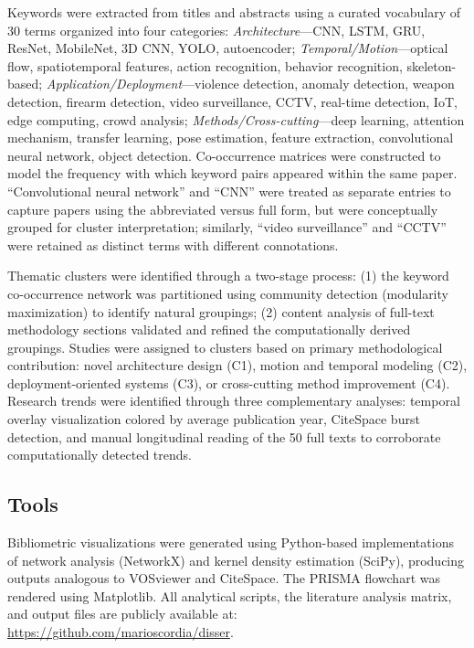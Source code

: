 \documentclass[conference]{IEEEtran}
\begin{document}
Keywords were extracted from titles and abstracts using a curated vocabulary of 30 terms organized into four categories: \textit{Architecture}---CNN, LSTM, GRU, ResNet, MobileNet, 3D CNN, YOLO, autoencoder; \textit{Temporal/Motion}---optical flow, spatiotemporal features, action recognition, behavior recognition, skeleton-based; \textit{Application/Deployment}---violence detection, anomaly detection, weapon detection, firearm detection, video surveillance, CCTV, real-time detection, IoT, edge computing, crowd analysis; \textit{Methods/Cross-cutting}---deep learning, attention mechanism, transfer learning, pose estimation, feature extraction, convolutional neural network, object detection. Co-occurrence matrices were constructed to model the frequency with which keyword pairs appeared within the same paper. ``Convolutional neural network'' and ``CNN'' were treated as separate entries to capture papers using the abbreviated versus full form, but were conceptually grouped for cluster interpretation; similarly, ``video surveillance'' and ``CCTV'' were retained as distinct terms with different connotations.

Thematic clusters were identified through a two-stage process: (1) the keyword co-occurrence network was partitioned using community detection (modularity maximization) to identify natural groupings; (2) content analysis of full-text methodology sections validated and refined the computationally derived groupings. Studies were assigned to clusters based on primary methodological contribution: novel architecture design (C1), motion and temporal modeling (C2), deployment-oriented systems (C3), or cross-cutting method improvement (C4). Research trends were identified through three complementary analyses: temporal overlay visualization colored by average publication year, CiteSpace burst detection, and manual longitudinal reading of the 50 full texts to corroborate computationally detected trends.

\subsection{Tools}

Bibliometric visualizations were generated using Python-based implementations of network analysis (NetworkX) and kernel density estimation (SciPy), producing outputs analogous to VOSviewer and CiteSpace. The PRISMA flowchart was rendered using Matplotlib. All analytical scripts, the literature analysis matrix, and output files are publicly available at: \url{https://github.com/marioscordia/disser}.
\end{document}
